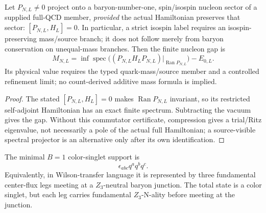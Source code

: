 \documentclass[12pt,a4paper]{article}
\begin{document}
\begin{theorem}
\label{p11:thm:native-nucleon-mass-eigenvalue}

Let \(P_{N,L}\ne0\) project onto a baryon-number-one, spin/isospin nucleon sector of a supplied full-QCD member, \emph{provided} the actual Hamiltonian preserves that sector: \([P_{N,L},H_L]=0\). In particular, a strict isospin label requires an isospin-preserving mass/source branch; it does not follow merely from baryon conservation on unequal-mass branches. Then the finite nucleon gap is
\[
M_{N,L}=\inf\operatorname{spec}\bigl((P_{N,L}H_LP_{N,L})|_{\operatorname{Ran}P_{N,L}}\bigr)-E_{0,L}.
\]
Its physical value requires the typed quark-mass/source member and a controlled refinement limit; no count-derived additive mass formula is implied.
\label{p11:eq:nucleon-sector-labels}
\label{p11:eq:nucleon-mass-transfer-eigenvalue}
\end{theorem}
\begin{proof}

The stated \([P_{N,L},H_L]=0\) makes \(\operatorname{Ran}P_{N,L}\) invariant, so its restricted self-adjoint Hamiltonian has an exact finite spectrum. Subtracting the vacuum gives the gap. Without this commutator certificate, compression gives a trial/Ritz eigenvalue, not necessarily a pole of the actual full Hamiltonian; a source-visible spectral projector is an alternative only after its own identification.
\end{proof}


\begin{definition}
\label{p11:def:finite-baryon-flux-junction-support}
The minimal \(B=1\) color-singlet support is
\begin{equation}
\epsilon_{abc}q^aq^bq^c .
\end{equation}
Equivalently, in Wilson-transfer language it is represented by three
fundamental center-flux legs meeting at a \(Z_3\)-neutral baryon junction.  The
total state is a color singlet, but each leg carries fundamental \(Z_3\)-N-ality
before meeting at the junction.
\end{definition}
\end{document}
